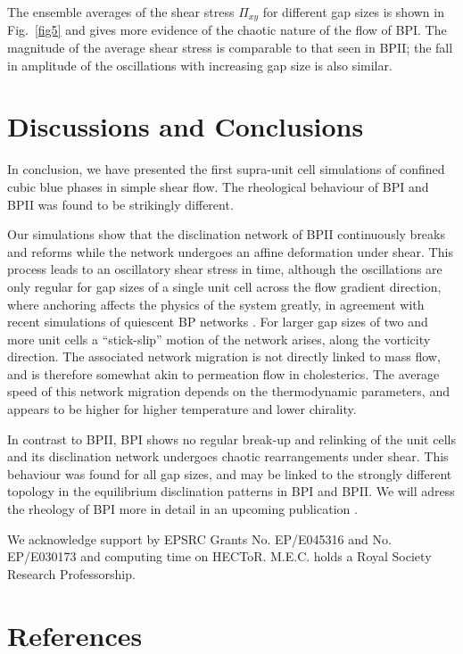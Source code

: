 \documentclass[12pt,twoside]{iopart}
\begin{document}
The ensemble averages of the shear stress $\Pi_{xy}$ for different gap sizes
is shown in Fig.~\ref{fig5} and gives more evidence of the chaotic nature of
the flow of BPI. The magnitude of the average shear stress is comparable to
that seen in BPII; the fall in amplitude of the oscillations with increasing
gap size is also similar.

\section{Discussions and Conclusions}

In conclusion, we have presented the first supra-unit cell simulations of
confined cubic blue phases in simple shear flow.
The rheological behaviour of BPI and BPII was found to be strikingly different.

Our simulations show that the disclination network of BPII continuously breaks and reforms while the network undergoes an affine deformation under shear. This process leads to an oscillatory shear stress in time, although the oscillations are only regular for gap sizes of a single unit cell across the flow gradient direction, where anchoring affects the physics of the system greatly, in agreement with recent simulations of quiescent BP networks \cite{Fukuda:2010a, Fukuda:2010b, Ravnik:2011b}.
For larger gap sizes of two and more unit cells a ``stick-slip'' motion of
the network arises, along the vorticity direction. The associated network
migration is not directly linked to mass flow, and is therefore somewhat
akin to permeation flow in cholesterics. The average speed of this network
migration depends on the thermodynamic parameters, and appears to be higher
for higher temperature and lower chirality. 

In contrast to BPII, BPI shows no regular break-up and relinking of the unit cells and its disclination network undergoes chaotic rearrangements under shear.
This behaviour was found for all gap sizes, and may be linked to the
strongly different topology in the equilibrium disclination patterns in
BPI and BPII. We will adress the rheology of BPI more in detail in an
upcoming publication \cite{Henrich:2012}.  

\ack
We acknowledge support by EPSRC Grants No. EP/E045316 and No. EP/E030173 and computing time on HECToR.
M.E.C. holds a Royal Society Research Professorship.


\section*{References}



\end{document}

